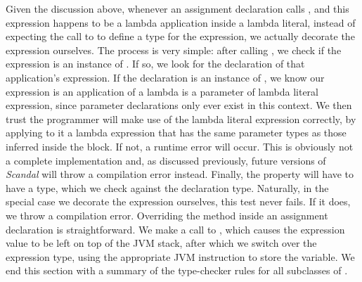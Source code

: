 Given the discussion above, whenever an assignment declaration calls , and this expression happens to be a lambda application inside a lambda literal, instead of expecting the call to  to define a type for the expression, we actually decorate the expression ourselves. The process is very simple: after calling , we check if the expression is an instance of . If so, we look for the declaration of that application's expression. If the declaration is an instance of , we know our expression is an application of a lambda is a parameter of lambda literal expression, since parameter declarations only ever exist in this context. We then trust the programmer will make use of the lambda literal expression correctly, by applying to it a lambda expression that has the same parameter types as those inferred inside the block. If not, a runtime error will occur. This is obviously not a complete implementation and, as discussed previously, future versions of \emph{Scandal} will throw a compilation error instead. Finally, the  property will have to have a type, which we check against the declaration type. Naturally, in the special case we decorate the expression ourselves, this test never fails. If it does, we throw a compilation error. Overriding the  method inside an assignment declaration is straightforward. We make a call to , which causes the expression value to be left on top of the JVM stack, after which we switch over the expression type, using the appropriate JVM instruction to store the variable. We end this section with a summary of the type-checker rules for all subclasses of .

